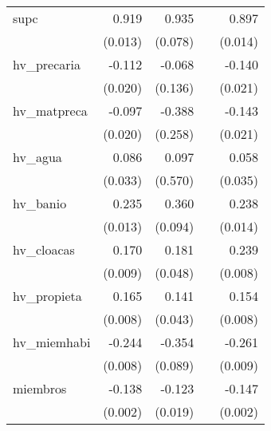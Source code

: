 {\begin{longtable}{l*{4}{D{.}{.}{-1}}}
\addlinespace
supc        &       0.919\sym{***}&       0.935\sym{***}&                     &       0.897\sym{***}\\
            &     (0.013)         &     (0.078)         &                     &     (0.014)         \\
\addlinespace
hv\_precaria &      -0.112\sym{***}&      -0.068         &                     &      -0.140\sym{***}\\
            &     (0.020)         &     (0.136)         &                     &     (0.021)         \\
\addlinespace
hv\_matpreca &      -0.097\sym{***}&      -0.388         &                     &      -0.143\sym{***}\\
            &     (0.020)         &     (0.258)         &                     &     (0.021)         \\
\addlinespace
hv\_agua     &       0.086\sym{**} &       0.097         &                     &       0.058         \\
            &     (0.033)         &     (0.570)         &                     &     (0.035)         \\
\addlinespace
hv\_banio    &       0.235\sym{***}&       0.360\sym{***}&                     &       0.238\sym{***}\\
            &     (0.013)         &     (0.094)         &                     &     (0.014)         \\
\addlinespace
hv\_cloacas  &       0.170\sym{***}&       0.181\sym{***}&                     &       0.239\sym{***}\\
            &     (0.009)         &     (0.048)         &                     &     (0.008)         \\
\addlinespace
hv\_propieta &       0.165\sym{***}&       0.141\sym{**} &                     &       0.154\sym{***}\\
            &     (0.008)         &     (0.043)         &                     &     (0.008)         \\
\addlinespace
hv\_miemhabi &      -0.244\sym{***}&      -0.354\sym{***}&                     &      -0.261\sym{***}\\
            &     (0.008)         &     (0.089)         &                     &     (0.009)         \\
\addlinespace
miembros    &      -0.138\sym{***}&      -0.123\sym{***}&                     &      -0.147\sym{***}\\
            &     (0.002)         &     (0.019)         &                     &     (0.002)         \\

\end{longtable}}
